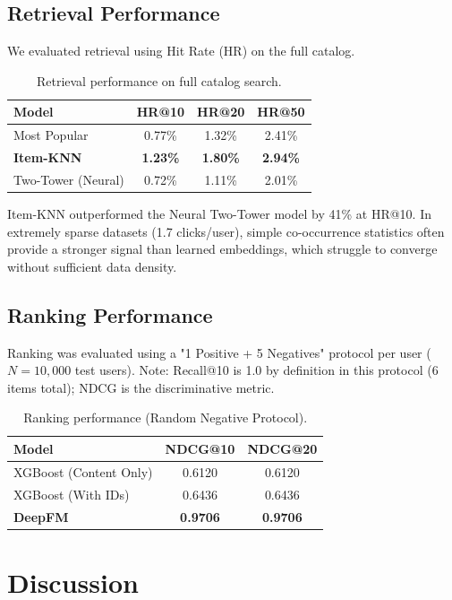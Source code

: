 \documentclass[twocolumn, 10pt, a4paper]{article}
\begin{document}
\subsection{Retrieval Performance}
We evaluated retrieval using Hit Rate (HR) on the full catalog.

\begin{table}[h]
\centering
\begin{tabular}{lccc}
\toprule
\textbf{Model} & \textbf{HR@10} & \textbf{HR@20} & \textbf{HR@50} \\
\midrule
Most Popular & 0.77\% & 1.32\% & 2.41\% \\
\textbf{Item-KNN} & \textbf{1.23\%} & \textbf{1.80\%} & \textbf{2.94\%} \\
Two-Tower (Neural) & 0.72\% & 1.11\% & 2.01\% \\
\bottomrule
\end{tabular}
\caption{Retrieval performance on full catalog search.}
\label{tab:retrieval}
\end{table}

Item-KNN outperformed the Neural Two-Tower model by 41\% at HR@10. In extremely sparse datasets (1.7 clicks/user), simple co-occurrence statistics often provide a stronger signal than learned embeddings, which struggle to converge without sufficient data density.

\subsection{Ranking Performance}
Ranking was evaluated using a "1 Positive + 5 Negatives" protocol per user ($N=10,000$ test users). Note: Recall@10 is 1.0 by definition in this protocol (6 items total); NDCG is the discriminative metric.

\begin{table}[h]
\centering
\begin{tabular}{lcc}
\toprule
\textbf{Model} & \textbf{NDCG@10} & \textbf{NDCG@20} \\
\midrule
XGBoost (Content Only) & 0.6120 & 0.6120 \\
XGBoost (With IDs) & 0.6436 & 0.6436 \\
\textbf{DeepFM} & \textbf{0.9706} & \textbf{0.9706} \\
\bottomrule
\end{tabular}
\caption{Ranking performance (Random Negative Protocol).}
\label{tab:ranking}
\end{table}

\section{Discussion}
\end{document}
